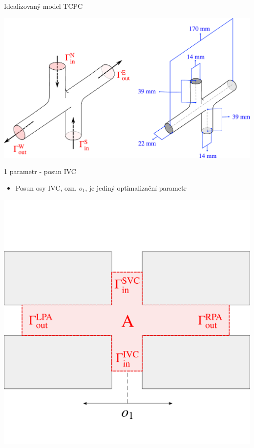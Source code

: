 \documentclass[aspectratio=169,xcolor=dvipsnames]{beamer}
\begin{document}
\begin{frame}{Idealizovaný model TCPC}
	\begin{center}	
		\includegraphics[width=0.7\linewidth, trim={0 0 0 0}, clip]{Images/3d-tcpc-schema-combined.pdf}	
	\end{center}		
\end{frame}
\begin{frame}{1 parametr - posun IVC}
	\begin{itemize}
		\item Posun osy IVC, ozn. $o_1$, je jediný optimalizační parametr
	\end{itemize}
	\begin{center}
		\includegraphics[width=0.55\linewidth, trim={0 0 0 36mm}, clip]{Images/model1.pdf}
	\end{center}			
\end{frame}
\end{document}
